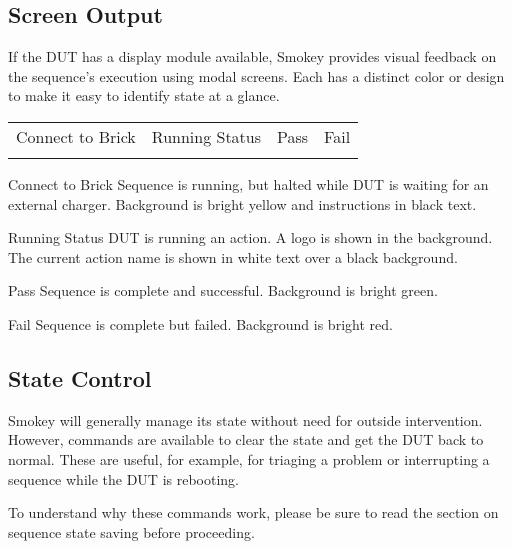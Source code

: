 \documentclass[11pt]{article}
\newcommand{\SmokeyTableParskipTop}{0.5\parskip}
\newcommand{\SmokeyTableParskipBottom}{\parskip}
\newenvironment{StatusScreenTable}{%
	\vspace{\SmokeyTableParskipTop}%
	\small%
	\begin{tabu}{| >{\centering}m{0.22\textwidth} >{\centering}m{0.22\textwidth} >{\centering}m{0.22\textwidth} >{\centering}m{0.22\textwidth} |}%
		\rowfont{\color{white}\cellcolor{SmokeyBlue}}%
		\taburulecolor{SmokeyBlue}%
		\hline%
	}%
	{%
		\hline%
	\end{tabu}%
	\vspace{\SmokeyTableParskipBottom}%
	}
\begin{document}
\subsection{Screen Output}

If the DUT has a display module available, Smokey provides visual feedback on
the sequence's execution using modal screens.  Each has a distinct color or
design to make it easy to identify state at a glance.

\begin{StatusScreenTable}
	Connect to Brick &  Running Status & Pass & Fail \\
	 &
	 &
	 &
	 \\
\end{StatusScreenTable}

\begin{Property}

\item[Connect to Brick] Sequence is running, but halted while DUT is waiting
	for an external charger.  Background is bright yellow and instructions
	in black text.

\item[Running Status] DUT is running an action.  A logo is shown in the
	background.  The current action name is shown in white text over a
	black background.

\item[Pass] Sequence is complete and successful.  Background is bright green.

\item[Fail] Sequence is complete but failed.  Background is bright red.

\end{Property}

\subsection{State Control}

Smokey will generally manage its state without need for outside intervention.
However, commands are available to clear the state and get the DUT back to
normal.  These are useful, for example, for triaging a problem or interrupting
a sequence while the DUT is rebooting.

To understand why these commands work, please be sure to read the section on
sequence state saving before proceeding.
\end{document}
